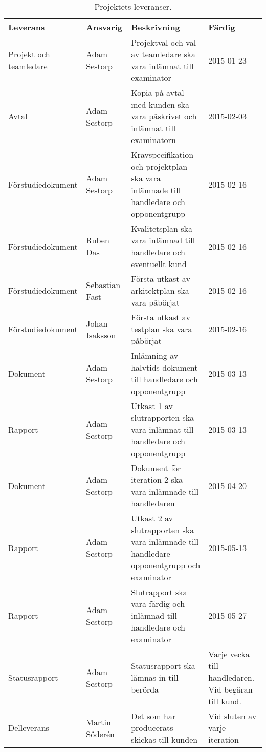 \begin{table}[H]
  \centering
    \begin{tabularx}{\textwidth}{| X | l | X | X |}
      \hline
      \textbf{Leverans} & \textbf{Ansvarig} & \textbf{Beskrivning} & \textbf{Färdig} \\
      \hline

      {Projekt och teamledare} & {Adam Sestorp} & {Projektval och val av teamledare ska vara inlämnat till examinator} & {2015-01-23} \\
            \hline
      {Avtal} & {Adam Sestorp} & {Kopia på avtal med kunden ska vara påskrivet och inlämnat till examinatorn} & {2015-02-03} \\
      \hline
      {Förstudiedokument} & {Adam Sestorp} & {Kravspecifikation och projektplan ska vara inlämnade till handledare och opponentgrupp} & {2015-02-16} \\
      \hline
      {Förstudiedokument} & {Ruben Das} & {Kvalitetsplan ska vara inlämnad till handledare och eventuellt kund} & {2015-02-16} \\
      \hline
      {Förstudiedokument} & {Sebastian Fast} & {Första utkast av arkitektplan ska vara påbörjat} & {2015-02-16} \\
      \hline
      {Förstudiedokument} & {Johan Isaksson} & {Första utkast av testplan ska vara påbörjat} & {2015-02-16} \\
      \hline
      {Dokument} & {Adam Sestorp} & {Inlämning av halvtids-dokument till handledare och opponentgrupp} & {2015-03-13} \\
      \hline
      {Rapport} & {Adam Sestorp} & {Utkast 1 av slutrapporten ska vara inlämnat till handledare och opponentgrupp} & {2015-03-13} \\
      \hline
      {Dokument} & {Adam Sestorp} & {Dokument för iteration 2 ska vara inlämnade till handledaren} & {2015-04-20} \\
      \hline
      {Rapport} & {Adam Sestorp} & {Utkast 2 av slutrapporten ska vara inlämnade till handledare opponentgrupp och examinator} & {2015-05-13} \\
      \hline
      {Rapport} & {Adam Sestorp} & {Slutrapport ska vara färdig och inlämnad till handledare och examinator} & {2015-05-27} \\
      \hline
      {Statusrapport} & {Adam Sestorp} & {Statusrapport ska lämnas in till berörda} & {Varje vecka till handledaren. Vid begäran till kund.} \\
      \hline
      {Delleverans} & {Martin Söderén} & {Det som har producerats skickas till kunden} & {Vid sluten av varje iteration} \\
      \hline

    \end{tabularx}
  \caption{Projektets leveranser.} \label{dokumentation:tabell}
\end{table}



